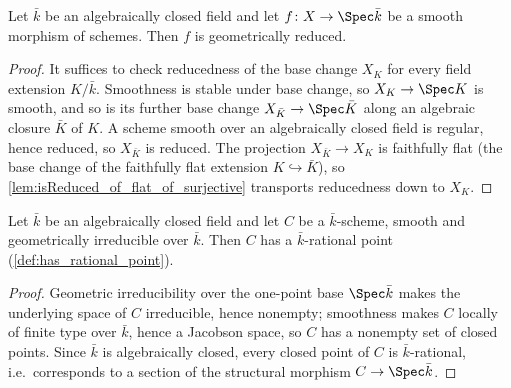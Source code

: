 \begin{lemma}
  \label{lem:geometrically_reduced_of_smooth}

  Let \(\bar k\) be an algebraically closed field and let
  \(f \colon X \to \Spec \bar k\) be a smooth morphism of schemes. Then \(f\)
  is geometrically reduced.
\end{lemma}

\begin{proof}\leanok
  It suffices to check reducedness of the base change \(X_K\) for every
  field extension \(K/\bar k\). Smoothness is stable under base change, so
  \(X_K \to \Spec K\) is smooth, and so is its further base change
  \(X_{\bar K} \to \Spec \bar K\) along an algebraic closure \(\bar K\) of
  \(K\). A scheme smooth over an algebraically closed field is regular,
  hence reduced, so \(X_{\bar K}\) is reduced. The projection
  \(X_{\bar K} \to X_K\) is faithfully flat (the base change of the
  faithfully flat extension \(K \hookrightarrow \bar K\)), so
  \cref{lem:isReduced_of_flat_of_surjective} transports reducedness down to
  \(X_K\).
\end{proof}

\begin{lemma}
  \label{lem:has_rational_point_of_isAlgClosed}

  Let \(\bar k\) be an algebraically closed field and let \(C\) be a
  \(\bar k\)-scheme, smooth and geometrically irreducible over \(\bar k\).
  Then \(C\) has a \(\bar k\)-rational point (\cref{def:has_rational_point}).
\end{lemma}

\begin{proof}\leanok
  Geometric irreducibility over the one-point base \(\Spec \bar k\) makes the
  underlying space of \(C\) irreducible, hence nonempty; smoothness makes
  \(C\) locally of finite type over \(\bar k\), hence a Jacobson space, so
  \(C\) has a nonempty set of closed points. Since \(\bar k\) is
  algebraically closed, every closed point of \(C\) is \(\bar k\)-rational,
  i.e.\ corresponds to a section of the structural morphism
  \(C \to \Spec \bar k\).
\end{proof}

